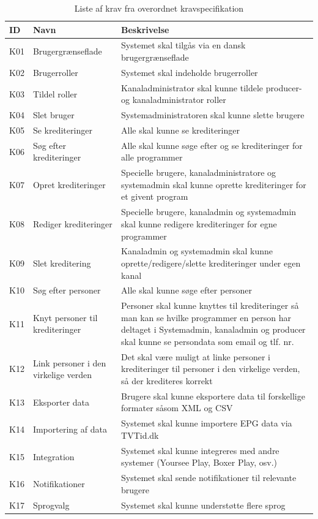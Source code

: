\begin{table}[ht]
    \begin{tabularx}{\textwidth}{|p{1cm}|p{4cm}|X|}
        \hline
        \textbf{ID} & \textbf{Navn} & \textbf{Beskrivelse} \\
        \hline
        K01 & Brugergrænseflade & Systemet skal tilgås via en dansk brugergrænseflade \\
        \hline
        K02 & Brugerroller & Systemet skal indeholde brugerroller \\
        \hline
        \label{K03}K03 & Tildel roller & Kanaladministrator skal kunne tildele producer- og kanaladministrator roller \\
        \hline
        K04 & Slet bruger & Systemadministratoren skal kunne slette brugere \\
        \hline
        K05 & Se krediteringer & Alle skal kunne se krediteringer \\
        \hline
        K06 & Søg efter krediteringer & Alle skal kunne søge efter og se krediteringer for alle programmer \\
        \hline
        K07 & Opret krediteringer & Specielle brugere, kanaladministratore og systemadmin skal kunne oprette
        krediteringer for et givent program \\
        \hline
        K08 & Rediger krediteringer & Specielle brugere, kanaladmin og systemadmin skal kunne redigere krediteringer for egne programmer \\
        \hline
        K09 & Slet kreditering & Kanaladmin og systemadmin skal kunne oprette/redigere/slette krediteringer under egen kanal \\
        \hline
        K10 & Søg efter personer & Alle skal kunne søge efter personer \\
        \hline
        K11 & Knyt personer til krediteringer & Personer skal kunne knyttes til krediteringer så man kan se hvilke programmer en person har deltaget i Systemadmin, kanaladmin og producer skal kunne se persondata som email og tlf. nr. \\
        \hline
        K12 & Link personer i den virkelige verden & Det skal være muligt at linke personer i krediteringer til personer i den virkelige verden, så der krediteres korrekt \\
        \hline
        K13 & Eksporter data & Brugere skal kunne eksportere data til forskellige formater såsom XML og CSV \\
        \hline
        K14 & Importering af data & Systemet skal kunne importere EPG data via TVTid.dk \\
        \hline
        K15 & Integration & Systemet skal kunne integreres med andre systemer (Yoursee Play, Boxer Play, osv.) \\
        \hline
        K16 & Notifikationer & Systemet skal sende notifikationer til relevante brugere \\
        \hline
        K17 & Sprogvalg & Systemet skal kunne understøtte flere sprog \\
        \hline
    \end{tabularx}
    \caption{Liste af krav fra overordnet kravspecifikation} 
    \label{table:kravliste}
\end{table} 

